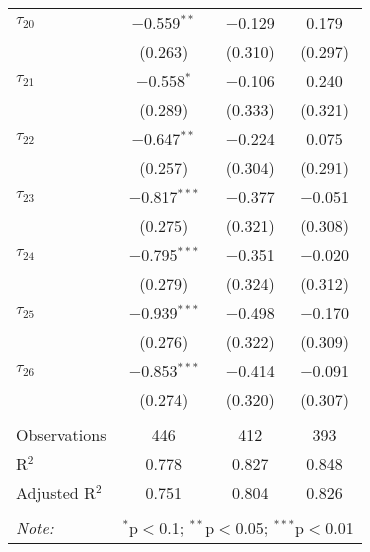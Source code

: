 \begin{tabular}{@{\extracolsep{5pt}}lccc}
 $\tau_{20}$ & $-$0.559$^{**}$ & $-$0.129 & 0.179 \\ 
  & (0.263) & (0.310) & (0.297) \\ 
   
 $\tau_{21}$ & $-$0.558$^{*}$ & $-$0.106 & 0.240 \\ 
  & (0.289) & (0.333) & (0.321) \\ 
   
 $\tau_{22}$ & $-$0.647$^{**}$ & $-$0.224 & 0.075 \\ 
  & (0.257) & (0.304) & (0.291) \\ 
   
 $\tau_{23}$ & $-$0.817$^{***}$ & $-$0.377 & $-$0.051 \\ 
  & (0.275) & (0.321) & (0.308) \\ 
   
 $\tau_{24}$ & $-$0.795$^{***}$ & $-$0.351 & $-$0.020 \\ 
  & (0.279) & (0.324) & (0.312) \\ 
   
 $\tau_{25}$ & $-$0.939$^{***}$ & $-$0.498 & $-$0.170 \\ 
  & (0.276) & (0.322) & (0.309) \\ 
   
 $\tau_{26}$ & $-$0.853$^{***}$ & $-$0.414 & $-$0.091 \\ 
  & (0.274) & (0.320) & (0.307) \\ 
   
\hline \\[-1.8ex] 
Observations & 446 & 412 & 393 \\ 
R$^{2}$ & 0.778 & 0.827 & 0.848 \\ 
Adjusted R$^{2}$ & 0.751 & 0.804 & 0.826 \\ 
\hline 
\hline \\[-1.8ex] 
\textit{Note:}  & \multicolumn{3}{r}{$^{*}$p$<$0.1; $^{**}$p$<$0.05; $^{***}$p$<$0.01} \\ 
\end{tabular} 